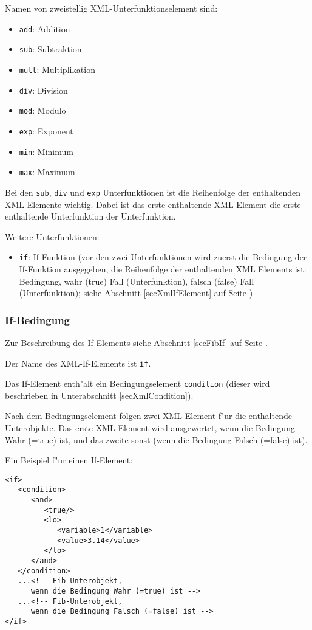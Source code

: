 \bigskip\noindent
Namen von zweistellig XML-Unterfunktionselement sind:
\begin{itemize}
 \item \verb|add|: Addition
 \item \verb|sub|: Subtraktion
 \item \verb|mult|: Multiplikation
 \item \verb|div|: Division
 \item \verb|mod|: Modulo
 \item \verb|exp|: Exponent
 \item \verb|min|: Minimum
 \item \verb|max|: Maximum
\end{itemize}
Bei den \verb|sub|, \verb|div| und \verb|exp| Unterfunktionen ist die Reihenfolge der enthaltenden XML-Elemente wichtig. Dabei ist das erste enthaltende XML-Element die erste enthaltende Unterfunktion der Unterfunktion.

\bigskip\noindent
Weitere Unterfunktionen:
\begin{itemize}
 \item \verb|if|: If-Funktion (vor den zwei Unterfunktionen wird zuerst die Bedingung der If-Funktion ausgegeben, die Reihenfolge der enthaltenden XML Elements ist: Bedingung, wahr (true) Fall (Unterfunktion), falsch (false) Fall (Unterfunktion); siehe Abschnitt   \ref{secXmlIfElement} auf Seite \pageref{secXmlIfElement})
\end{itemize}



\subsubsection{If-Bedingung}
\label{secXmlIfElement}

Zur Beschreibung des If-Elements siehe Abschnitt \ref{secFibIf} auf Seite \pageref{secFibIf} .

Der Name des XML-If-Elements ist \verb|if|.

Das If-Element enth"alt ein Bedingungselement \verb|condition| (dieser wird beschrieben in Unterabschnitt \ref{secXmlCondition}).

Nach dem Bedingungselement folgen zwei XML-Element f"ur die enthaltende Unterobjekte. Das erste XML-Element wird ausgewertet, wenn die Bedingung Wahr (=true) ist, und das zweite sonst (wenn die Bedingung Falsch (=false) ist).

\bigskip\noindent
Ein Beispiel f"ur einen If-Element:
\begin{verbatim}
<if>
   <condition>
      <and>
         <true/>
         <lo>
            <variable>1</variable>
            <value>3.14</value>
         </lo>
      </and>
   </condition>
   ...<!-- Fib-Unterobjekt,
      wenn die Bedingung Wahr (=true) ist -->
   ...<!-- Fib-Unterobjekt,
      wenn die Bedingung Falsch (=false) ist -->
</if>
\end{verbatim}


